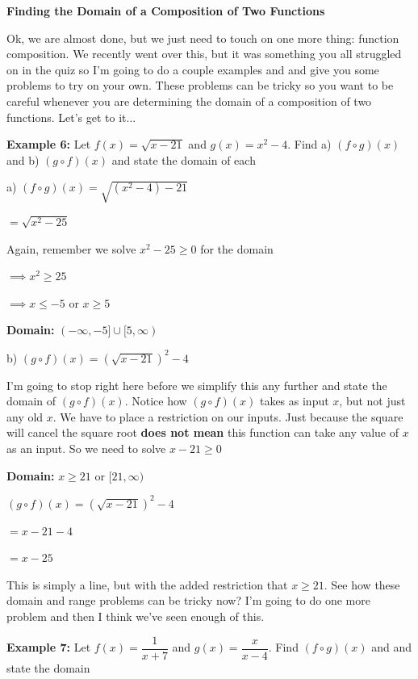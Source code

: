 \documentclass[12pt]{article}
\begin{document}
\textbf{Finding the Domain of a Composition of Two Functions}

Ok, we are almost done, but we just need to touch on one more thing: function composition. We recently went over this, but it was something you all struggled on in the quiz so I'm going to do a couple examples and and give you some problems to try on your own. These problems can be tricky so you want to be careful whenever you are determining the domain of a composition of two functions. Let's get to it...
\newpage

\textbf{Example 6:} Let $f(x) = \sqrt{x-21}$ and $g(x) = x^2-4$. Find a) $(f \circ g)(x)$ and b) $(g \circ f)(x)$ and state the domain of each

a)  $(f \circ g)(x) = \sqrt{(x^2-4)-21}$

\hspace{2.2cm} $= \sqrt{x^2-25}$

Again, remember we solve $x^2-25 \geq 0$ for the domain

$\implies x^2 \geq 25$

$\implies x\leq -5$ or $x \geq 5$

\textbf{Domain:} $(-\infty, -5] \cup [5, \infty)$

b) $(g \circ f)(x) = (\sqrt{x-21})^2-4$

I'm going to stop right here before we simplify this any further and state the domain of  $(g \circ f)(x)$. Notice how  $(g \circ f)(x)$ takes as input $x$, but not just any old $x$. We have to place a restriction on our inputs. Just because the square will cancel the square root \textbf{does not mean} this function can take any value of $x$ as an input. So we need to solve $x-21 \geq 0$

\textbf{Domain:} $x \geq 21$ or $[21, \infty)$

$(g \circ f)(x) =  (\sqrt{x-21})^2-4$

\hspace{1.7cm} $= x - 21 - 4$

\hspace{1.7cm} $= x-25$

This is simply a line,  but with the added restriction that $x \geq 21$. See how these domain and range problems can be tricky now? I'm going to do one more problem and then I think we've seen enough of this. 

\newpage

\textbf{Example 7:} Let $f(x) = \dfrac{1}{x+7}$ and $g(x) = \dfrac{x}{x-4}$. Find $(f \circ g)(x)$ and and state the domain
\end{document}
